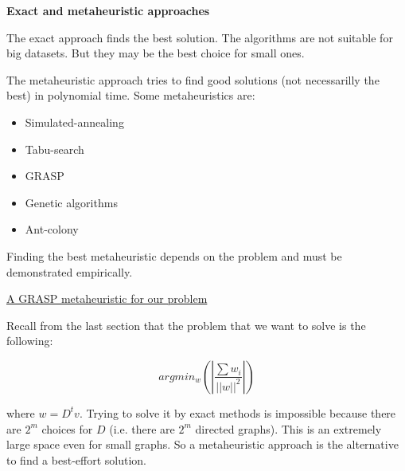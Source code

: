 \documentclass[a4paper,11pt]{article}
\begin{document}
\bigskip


\textbf{Exact and metaheuristic approaches}

\bigskip

The exact approach finds the best solution. The algorithms are not 
suitable for big datasets. But they may be the best choice for small 
ones.

\bigskip

The metaheuristic approach tries to find good solutions (not 
necessarilly the best) in polynomial time. Some metaheuristics are:

\begin{itemize}
	\item Simulated-annealing
	\item Tabu-search
	\item GRASP
	\item Genetic algorithms
	\item Ant-colony
\end{itemize}

Finding the best metaheuristic depends on the problem and must be 
demonstrated empirically.

\bigskip

\underline{A GRASP metaheuristic for our problem}

\bigskip

Recall from the last section that the problem that we want to solve is 
the following:

$$argmin_w(|\frac{\sum w_i}{||w||^2}|)$$

where $w = D^t v$. Trying to solve it by exact methods is impossible 
because there are $2^m$ choices for $D$ (i.e. there are $2^m$ directed 
graphs). This is an extremely large space even for small graphs. So a 
metaheuristic approach is the alternative to find a best-effort solution.
\end{document}

